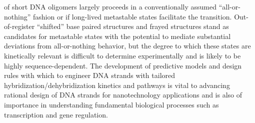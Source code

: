 \documentclass[journal=jpcbfk,manuscript=article]{achemso}
\begin{document}
of short DNA oligomers largely proceeds in a conventionally assumed ``all-or-nothing'' fashion or if long-lived metastable states facilitate the transition.\citep{Araque2016LatticeCooperativity, Sikora2013ModelingIntermediates, Wyer2014KineticsAT-tracts, Sanstead2016, Sanstead2018DirectDehybridization, Xiao2019} Out-of-register ``shifted'' base paired structures \citep{Hinckley2014Coarse-grainedEffects, Maciejczyk2014DNAModel, Araque2016LatticeCooperativity, Xiao2019} and frayed structures \citep{Zgarbova2014BaseRNA, Nonin1995TerminalFraying, Nikolova2012ProbingSimulations, Andreatta2006UltrafastHelix} stand as candidates for metastable states with the potential to mediate substantial deviations from all-or-nothing behavior, but the degree to which these states are kinetically relevant is difficult to determine experimentally and is likely to be highly sequence-dependent. The development of predictive models and design rules with which to engineer DNA strands with tailored hybridization/dehybridization kinetics and pathways is vital to advancing rational design of DNA strands for nanotechnology applications and is also of importance in understanding fundamental biological processes such as transcription and gene regulation.
\end{document}
